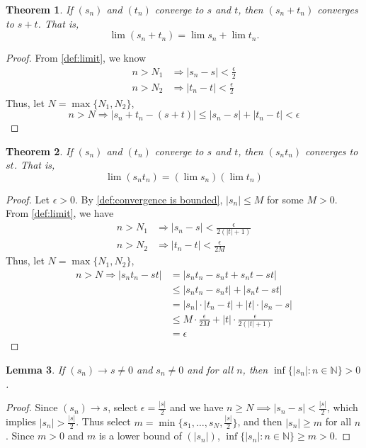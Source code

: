 \documentclass[12pt, lettersize]{book}
\theoremstyle{plain}
\newtheorem{thm}{Theorem}[section]
\newtheorem{lem}[thm]{Lemma}
\theoremstyle{definition}
\theoremstyle{remark}
\newcommand{\N}{\mathbb{N}}
\begin{document}
		\begin{thm}\label{def:addition}
		If $(s_n)$ and $(t_n)$ converge to $s$ and $t$, then $(s_n+t_n)$ converges to $s+t$. That is,
		\begin{displaymath}
			\lim(s_n+t_n)=\lim s_n+\lim t_n.
		\end{displaymath} 
		\end{thm}
		\begin{proof}
		From \ref{def:limit}, we know
		\begin{align*}
			n>N_1&\Rightarrow|s_n-s|<\frac{\epsilon}{2}\\
			n>N_2&\Rightarrow|t_n-t|<\frac{\epsilon}{2}
		\end{align*}
		Thus, let $N=\max\{N_1,N_2\}$,
		\begin{displaymath}
			n>N \Rightarrow |s_n+t_n-(s+t)|\leq|s_n-s|+|t_n-t|<\epsilon
		\end{displaymath}
		\end{proof}
	
		\begin{thm}\label{def:multiplication}
		If $(s_n)$ and $(t_n)$ converge to $s$ and $t$, then $(s_nt_n)$ converges to $st$. That is,
		\begin{displaymath}
			\lim(s_nt_n)=(\lim s_n)(\lim t_n)
		\end{displaymath} 
		\end{thm}
		\begin{proof}
		Let $\epsilon>0$. By \ref{def:convergence is bounded}, $|s_n|\leq M$ for some $M>0$. From \ref{def:limit}, we have
		\begin{align*}
			n>N_1&\Rightarrow|s_n-s|<\frac{\epsilon}{2(|t|+1)}\\
			n>N_2&\Rightarrow|t_n-t|<\frac{\epsilon}{2M}
		\end{align*}
		Thus, let $N=\max\{N_1,N_2\}$,
		\begin{align*}
			n>N \Rightarrow |s_nt_n-st|&=|s_nt_n-s_nt+s_nt-st|\\
									   &\leq|s_nt_n-s_nt|+|s_nt-st|\\
									   &=|s_n|\cdot|t_n-t|+|t|\cdot|s_n-s|\\
									   &\leq M\cdot\frac{\epsilon}{2M}+|t|\cdot\frac{\epsilon}{2(|t|+1)}\\
									   &=\epsilon
		\end{align*}
		\end{proof}
		
		\begin{lem}
		If $(s_n)\rightarrow s\neq0$ and $s_n\neq0$ and  for all $n$, then $\inf\{|s_n|: n\in\N\}>0$.
		\end{lem}
		\begin{proof}
		Since $(s_n)\rightarrow s$, select $\epsilon=\frac{|s|}{2}$ and we have $n\geq N\implies|s_n-s|<\frac{|s|}{2}$, which implies $|s_n|>\frac{|s|}{2}$. Thus select $m=\min\{s_1,\dots,s_N,\frac{|s|}{2}\}$, and then $|s_n|\geq m$ for all $n$. Since $m>0$ and $m$ is a lower bound of $(|s_n|)$, $\inf\{|s_n|: n\in\N\}\geq m>0$.
		\end{proof}
		
\end{document}

